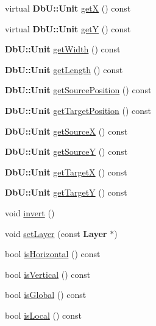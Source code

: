 \begin{DoxyCompactItemize}
\item 
virtual \textbf{ Db\+U\+::\+Unit} \hyperlink{classKatabatic_1_1AutoSegment_a00b8f54c8171f6699e57de1b8c18eeb1}{getX} () const
\item 
virtual \textbf{ Db\+U\+::\+Unit} \hyperlink{classKatabatic_1_1AutoSegment_a4580de6b074712e400d5d238ce3af054}{getY} () const
\item 
\textbf{ Db\+U\+::\+Unit} \hyperlink{classKatabatic_1_1AutoSegment_a9c63fe7288748eaf5332ca796a36d872}{get\+Width} () const
\item 
\textbf{ Db\+U\+::\+Unit} \hyperlink{classKatabatic_1_1AutoSegment_ab1ca7adfc68761c749a16f65c9aa4088}{get\+Length} () const
\item 
\textbf{ Db\+U\+::\+Unit} \hyperlink{classKatabatic_1_1AutoSegment_a8a88dc051a8d324aff8763609957dcaa}{get\+Source\+Position} () const
\item 
\textbf{ Db\+U\+::\+Unit} \hyperlink{classKatabatic_1_1AutoSegment_a65dea76b4efad9d3caa78be44e96c94c}{get\+Target\+Position} () const
\item 
\textbf{ Db\+U\+::\+Unit} \hyperlink{classKatabatic_1_1AutoSegment_a8a8e127557d70de70f9efb488be30d1a}{get\+SourceX} () const
\item 
\textbf{ Db\+U\+::\+Unit} \hyperlink{classKatabatic_1_1AutoSegment_ae913463a76d08b079611a993cebea1a9}{get\+SourceY} () const
\item 
\textbf{ Db\+U\+::\+Unit} \hyperlink{classKatabatic_1_1AutoSegment_a8e6462b43ca9eaeea1e08866cec59a8c}{get\+TargetX} () const
\item 
\textbf{ Db\+U\+::\+Unit} \hyperlink{classKatabatic_1_1AutoSegment_a003e545e792e8bf22d264bcb3bc90547}{get\+TargetY} () const
\item 
void \hyperlink{classKatabatic_1_1AutoSegment_acbac6289ab14574da20f26c933e2e741}{invert} ()
\item 
void \hyperlink{classKatabatic_1_1AutoSegment_aad4271c35e0162c8a4d034dca07f5a4b}{set\+Layer} (const \textbf{ Layer} $\ast$)
\item 
bool \hyperlink{classKatabatic_1_1AutoSegment_a21b9cefd33ae22e4c2070ad441bdd30b}{is\+Horizontal} () const
\item 
bool \hyperlink{classKatabatic_1_1AutoSegment_abd54544ef1710ee4b67cfb021d73446c}{is\+Vertical} () const
\item 
bool \hyperlink{classKatabatic_1_1AutoSegment_a19ba379112d6b29faa45c5eefbf38500}{is\+Global} () const
\item 
bool \hyperlink{classKatabatic_1_1AutoSegment_add556a145a89fdbcea82346abfb873dc}{is\+Local} () const

\end{DoxyCompactItemize}
